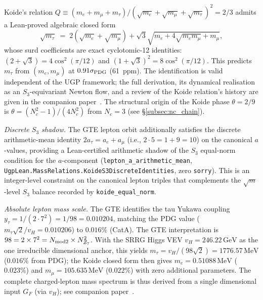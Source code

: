 \documentclass[11pt]{article}
\theoremstyle{remark}
\begin{document}
Koide's relation $Q \equiv (m_e + m_\mu + m_\tau)/(\sqrt{m_e}+\sqrt{m_\mu}+\sqrt{m_\tau})^2 = 2/3$ admits a Lean-proved algebraic closed form
\[
\sqrt{m_\tau} \;=\; 2(\sqrt{m_e}+\sqrt{m_\mu}) + \sqrt{3}\sqrt{m_e + 4\sqrt{m_e m_\mu}+m_\mu},
\]
whose surd coefficients are exact cyclotomic-12 identities: $(2+\sqrt{3}) = 4\cos^2(\pi/12)$ and $(1+\sqrt{3})^2 = 8\cos^2(\pi/12)$.  This predicts $m_\tau$ from $(m_e, m_\mu)$ at $0.91\sigma_{\rm PDG}$ (61~ppm).  The identification is valid independent of the UGP framework; the full derivation, its dynamical realisation as an $S_3$-equivariant Newton flow, and a review of the Koide relation's history are given in the companion paper~\cite{Spivack2026_Koide}.  The structural origin of the Koide phase $\theta = 2/9$ is $\theta = (N_c^2-1)/(4N_c^2)$ from $N_c = 3$ (see \S\ref{subsec:nc_chain}).

\begin{sloppypar}
\noindent\emph{Discrete $S_3$ shadow.}
The GTE lepton orbit additionally satisfies the discrete arithmetic-mean identity
$2 a_\tau = a_e + a_\mu$ (i.e., $2 \cdot 5 = 1 + 9 = 10$) on the canonical
$a$-values, providing a Lean-certified arithmetic shadow of the $S_3$ equal-norm
condition for the $a$-component (\texttt{lepton\_a\_arithmetic\_mean},
\texttt{UgpLean.\allowbreak MassRelations.\allowbreak KoideS3DiscreteIdentities},
zero \texttt{sorry}).
This is an integer-level constraint on the canonical lepton triples that complements
the $\sqrt{m}$-level $S_3$ balance recorded by \texttt{koide\_equal\_norm}.
\end{sloppypar}

\noindent\emph{Absolute lepton mass scale.}
The GTE identifies the tau Yukawa coupling $y_\tau = 1/(2 \cdot 7^2) = 1/98 = 0.010204$, matching the PDG value ($m_\tau\sqrt{2}/v_H = 0.010206$) to $0.016\%$ (CatA).  The GTE interpretation is $98 = 2 \times 7^2 = N_{\rm mod2} \times N_{Z_7}^2$.  With the SRRG Higgs VEV $v_H = 246.22\,\text{GeV}$ as the one irreducible dimensional anchor, this yields $m_\tau = v_H/(98\sqrt{2}) = 1776.57\,\text{MeV}$ ($0.016\%$ from PDG); the Koide closed form then gives $m_e = 0.51088\,\text{MeV}$ ($0.023\%$) and $m_\mu = 105.635\,\text{MeV}$ ($0.022\%$) with zero additional parameters.  The complete charged-lepton mass spectrum is thus derived from a single dimensional input $G_F$ (via $v_H$); see companion paper~\cite{Spivack2026_Koide}.


\end{document}
